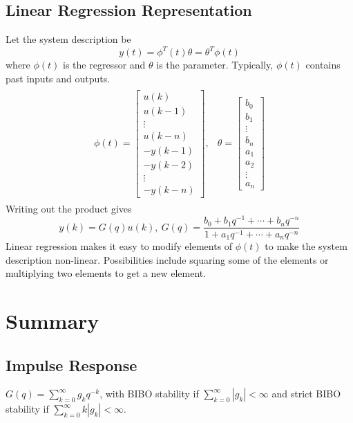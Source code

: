 \documentclass[lecture,12pt,]{pcms-l}
\theoremstyle{example}
\begin{document}
\subsection{Linear Regression Representation}
Let the system description be
$$y(t)=\phi^T(t)\theta = \theta^T\phi(t)$$
where $\phi(t)$ is the regressor and $\theta$ is the parameter. Typically, $\phi(t)$ contains past inputs and outputs.
\begin{align*}
\begin{split}
\phi(t) = \left[\begin{array}{c}
			u(k) \\
			u(k-1) \\
			\vdots \\
			u(k-n) \\
			-y(k-1) \\
			-y(k-2) \\
			\vdots \\
			-y(k-n)
		\end{array}\right],
\end{split}
\begin{split}
\theta = \left[\begin{array}{c}
			b_0 \\
			b_1 \\
			\vdots \\
			b_n \\
			a_1 \\
			a_2 \\
			\vdots \\
			a_n
		\end{array}\right]
\end{split}
\end{align*}
Writing out the product gives
$$y(k) = G(q)u(k), ~ G(q) = \frac{b_0+b_1q^{-1}+\cdots+b_nq^{-n}}{1+a_1q^{-1}+\cdots+a_nq^{-n}}$$
Linear regression makes it easy to modify elements of $\phi(t)$ to make the system description non-linear. Possibilities include squaring some of the elements or multiplying two elements to get a new element.

\section{Summary}
\subsection{Impulse Response}
$G(q) = \sum_{k=0}^\infty g_kq^{-k}$, with BIBO stability if $\sum_{k=0}^\infty |g_k| < \infty$ and strict BIBO stability if $\sum_{k=0}^\infty k|g_k| < \infty$.
\end{document}
